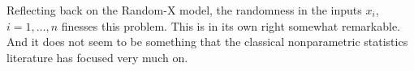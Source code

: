 \documentclass{article}
\begin{document}
Reflecting back on the Random-X model, the randomness in the inputs $x_i$,
$i=1,\dots,n$ finesses this problem. This is in its own right somewhat
remarkable. And it does not seem to be something that the classical
nonparametric statistics literature has focused very much on. 



\end{document}
